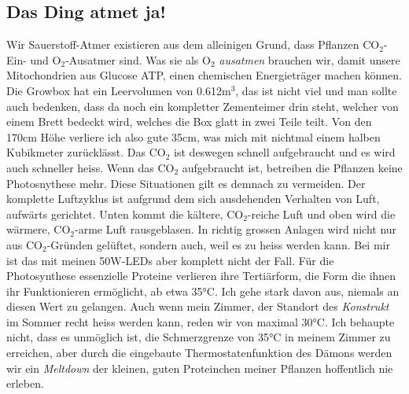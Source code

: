 \documentclass[12pt,titlepage,a4paper]{article}
\begin{document}
\subsection{Das Ding atmet ja!}
Wir Sauerstoff-Atmer existieren aus dem alleinigen Grund, dass Pflanzen CO$ _{2} $-Ein- und O$ _{2} $-Ausatmer sind. Was sie als O$ _{2} $ \textit{ausatmen} brauchen wir, damit unsere Mitochondrien aus Glucose ATP, einen chemischen Energieträger machen können.
Die Growbox hat ein Leervolumen von 0.612m$ ^{3} $, das ist nicht viel und man sollte auch bedenken, dass da noch ein kompletter Zementeimer drin steht, welcher von einem Brett bedeckt wird, welches die Box glatt in zwei Teile teilt. Von den 170cm Höhe verliere ich also gute 35cm, was mich mit nichtmal einem halben Kubikmeter zurücklässt. Das CO$ _{2} $ ist deswegen schnell aufgebraucht und es wird auch schneller heiss. Wenn das CO$ _{2} $ aufgebraucht ist, betreiben die Pflanzen keine Photosnythese mehr. Diese Situationen gilt es demnach zu vermeiden. Der komplette Luftzyklus ist aufgrund dem sich ausdehenden Verhalten von Luft, aufwärts gerichtet. Unten kommt die kältere, CO$ _{2} $-reiche Luft und oben wird die wärmere, CO$ _{2} $-arme Luft rausgeblasen. In richtig grossen Anlagen wird nicht nur aus CO$ _{2} $-Gründen gelüftet, sondern auch, weil es zu heiss werden kann. Bei mir ist das mit meinen 50W-LEDs aber komplett nicht der Fall. Für die Photosynthese essenzielle Proteine verlieren ihre Tertiärform, die Form die ihnen ihr Funktionieren ermöglicht, ab etwa 35°C. Ich gehe stark davon aus, niemals an diesen Wert zu gelangen. Auch wenn mein Zimmer, der Standort des \textit{Konstrukt} im Sommer recht heiss werden kann, reden wir von maximal 30°C. Ich behaupte nicht, dass es unmöglich ist, die Schmerzgrenze von 35°C in meinem Zimmer zu erreichen, aber durch die eingebaute Thermostatenfunktion des Dämons werden wir ein \textit{Meltdown} der kleinen, guten Proteinchen meiner Pflanzen hoffentlich nie erleben.
\end{document}
